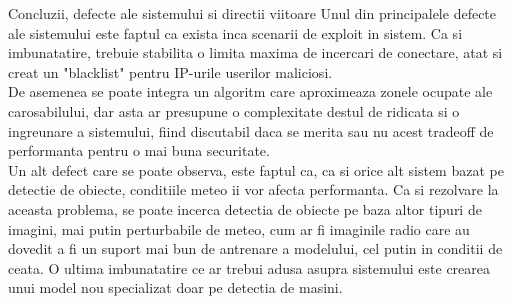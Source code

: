 \documentclass{beamer}
\begin{document}
    \begin{frame}{Concluzii, defecte ale sistemului si directii viitoare}
        Unul din principalele defecte ale sistemului este faptul ca 
        exista inca scenarii de exploit in sistem.
        Ca si imbunatatire, trebuie stabilita o limita maxima de incercari de 
        conectare, atat si creat un "blacklist" pentru IP-urile userilor maliciosi. \\
        De asemenea se poate integra un algoritm care aproximeaza zonele ocupate ale 
        carosabilului, dar asta ar presupune o complexitate destul de ridicata si o 
        ingreunare a sistemului, fiind discutabil daca se merita sau nu acest 
        tradeoff de performanta pentru o mai buna securitate.\\
        Un alt defect care se poate observa, este faptul ca, ca si orice alt 
        sistem bazat pe detectie de obiecte, conditiile meteo ii vor 
        afecta performanta. Ca si rezolvare la aceasta problema, se poate 
        incerca detectia de obiecte pe baza altor tipuri de imagini, mai putin 
        perturbabile de meteo, cum ar fi imaginile radio care au dovedit a fi 
        un suport mai bun de antrenare a modelului, cel putin in conditii de ceata.
        O ultima imbunatatire ce ar trebui adusa asupra sistemului este crearea unui 
        model nou specializat doar pe detectia de masini.
    \end{frame}
\end{document}
